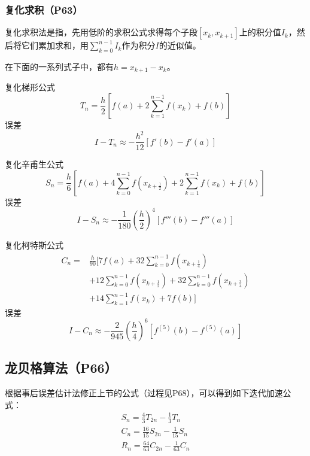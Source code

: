 \documentclass[fontset=ubuntu]{ctexart}
\numberwithin{equation}{section}
\numberwithin{theorem}{section}
\begin{document}
\begin{multicols}{2}
    \subsubsection{复化求积（P63）}

    复化求积法是指，先用低阶的求积公式求得每个子段$[x_k,x_{k+1}]$上的积分值$I_k$，然后将它们累加求和，用$\sum_{k=0}^{n-1}I_k$作为积分$I$的近似值。

    在下面的一系列式子中，都有$h=x_{k+1}-x_k$。

    复化梯形公式
    \begin{equation}
        T_n=\frac{h}{2}\left[f(a)+2\sum_{k=1}^{n-1}f(x_k)+f(b)\right]
    \end{equation}
    误差
    \begin{equation}
        I-T_n\approx -\frac{h^2}{12}\left[f'(b)-f'(a)\right]
    \end{equation}

    复化辛甫生公式
    \begin{equation}
        S_n=\frac{h}{6}\left[f(a)+4\sum_{k=0}^{n-1}f(x_{k+\frac{1}{2}})+2\sum_{k=1}^{n-1}f(x_k)+f(b)\right]
    \end{equation}
    误差
    \begin{equation}
        I-S_n\approx -\frac{1}{180}\left(\frac{h}{2}\right)^4\left[f'''(b)-f'''(a)\right]
    \end{equation}

    复化柯特斯公式
    \begin{align}
        C_n=& \frac{h}{90} \biggl[ 7f(a)+32\sum_{k=0}^{n-1} f(x_{k+\frac{1}{4}}) \nonumber \\
        &+12 \sum_{k=0}^{n-1} f(x_{k+\frac{1}{2}}) + 32\sum_{k=0}^{n-1} f(x_{k+\frac{3}{4}}) \nonumber \\
        &+14 \sum_{k=1}^{n-1} f(x_k)+7f(b) \biggr]
    \end{align}
    误差
    \begin{equation}
        I-C_n\approx -\frac{2}{945}\left(\frac{h}{4}\right)^6\left[f^{(5)}(b)-f^{(5)}(a)\right]
    \end{equation}

    \subsection{龙贝格算法（P66）}

    根据事后误差估计法修正上节的公式（过程见P68），可以得到如下迭代加速公式：
    \begin{gather}
        S_n = \frac{4}{3}T_{2n}-\frac{1}{3}T_n \\
        C_n = \frac{16}{15}S_{2n}-\frac{1}{15}S_n \\
        R_n = \frac{64}{63}C_{2n}-\frac{1}{63}C_n
    \end{gather}


\end{multicols}
\end{document}
